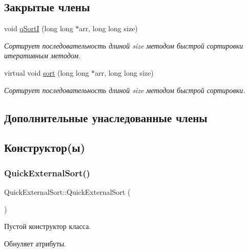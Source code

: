 \subsection*{Закрытые члены}
\begin{DoxyCompactItemize}
\item 
void \hyperlink{class_quick_external_sort_ad7653bb697a04717066f9942db9a4597}{q\+SortI} (long long $\ast$arr, long long size)
\begin{DoxyCompactList}\small\item\em Сортирует последовательность длиной size методом быстрой сортировки итеративным методом. \end{DoxyCompactList}\item 
virtual void \hyperlink{class_quick_external_sort_ab277b5945ac22cdcda10bf02e56eb8db}{sort} (long long $\ast$arr, long long size)
\begin{DoxyCompactList}\small\item\em Сортирует последовательность длиной size методом быстрой сортировки. \end{DoxyCompactList}\end{DoxyCompactItemize}
\subsection*{Дополнительные унаследованные члены}


\subsection{Конструктор(ы)}
\hypertarget{class_quick_external_sort_ac31914e67af41c48b8fdcbcc076168ed}{}\label{class_quick_external_sort_ac31914e67af41c48b8fdcbcc076168ed} 
\subsubsection{\texorpdfstring{Quick\+External\+Sort()}{QuickExternalSort()}}
{\footnotesize\ttfamily Quick\+External\+Sort\+::\+Quick\+External\+Sort (\begin{DoxyParamCaption}{ }\end{DoxyParamCaption})}



Пустой конструктор класса. 

Обнуляет атрибуты. \hypertarget{class_quick_external_sort_a370e2be5e7c4afc31f9b230c2ee4d689}{}\label{class_quick_external_sort_a370e2be5e7c4afc31f9b230c2ee4d689} 
